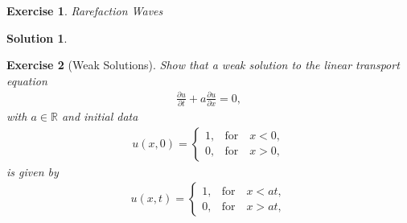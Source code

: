 \documentclass[10pt,letterpaper]{article}
\theoremstyle{break}
\newtheorem{exercise}{Exercise}
\newtheorem{mysolution}{Solution}
\newenvironment{solution}{\begin{mysolution}}{\end{mysolution}}
\begin{document}
\begin{exercise}{Rarefaction Waves}
\end{exercise}

\begin{solution}
    
\end{solution}



\begin{exercise}[Weak Solutions]
    Show that a weak solution to the linear transport equation 
    \begin{gather*}
    	\frac{\partial u}{\partial t} 
    	+ 
    	a 
    	\frac{\partial u}{\partial x}  = 0, 
    \end{gather*}
    with $a\in \mathbb{R}$ and initial data 
    \begin{align}
    	u(x,0) = 
    	\left\{
    	\begin{array}{ll}
    	1, & \text{for} \quad x<0,\\
    	0, &\text{for} \quad x > 0,
    	\end{array}
    	\right.
    \end{align}
    is given by
    \begin{align} 
    	u(x,t) = 
    	\left\{
    	\begin{array}{ll}
    	1, & \text{for} \quad x<at,\\
    	0, & \text{for} \quad x > at,
    	\end{array}
    	\right.
    \end{align}
\end{exercise}
\end{document}
